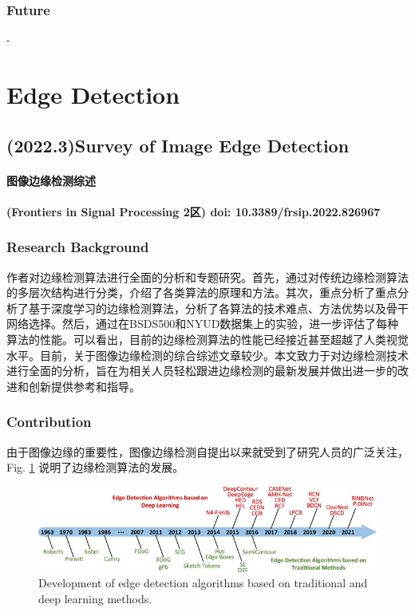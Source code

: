 \documentclass[a4paper, 10pt]{article}
\begin{document}
			\subsubsection{Future}
		
			-
	\section{Edge Detection}
		
		\subsection{(2022.3)Survey of Image Edge Detection}
			
		\paragraph{图像边缘检测综述}
			
		\paragraph{(Frontiers in Signal Processing 2区) doi: 10.3389/frsip.2022.826967}
			
			\subsubsection{Research Background}
				
			作者对边缘检测算法进行全面的分析和专题研究。首先，通过对传统边缘检测算法的多层次结构进行分类，介绍了各类算法的原理和方法。其次，重点分析了重点分析了基于深度学习的边缘检测算法，分析了各算法的技术难点、方法优势以及骨干网络选择。然后，通过在BSDS500和NYUD数据集上的实验，进一步评估了每种算法的性能。可以看出，目前的边缘检测算法的性能已经接近甚至超越了人类视觉水平。目前，关于图像边缘检测的综合综述文章较少。本文致力于对边缘检测技术进行全面的分析，旨在为相关人员轻松跟进边缘检测的最新发展并做出进一步的改进和创新提供参考和指导。
			
			\subsubsection{Contribution}
			
			由于图像边缘的重要性，图像边缘检测自提出以来就受到了研究人员的广泛关注，Fig. \ref{fig: Development} 说明了边缘检测算法的发展。
			
			\begin{figure}[htbp]
				\centering 
				\includegraphics[width=\columnwidth]{picture/Edge Detection/Development}
				\caption{
					\label{fig: Development} 
					Development of edge detection algorithms based on traditional and deep learning methods.
				}
			\end{figure}
			
\end{document}
